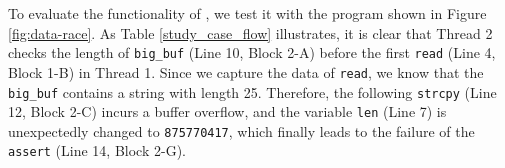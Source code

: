 \begin{table}[]
    \caption{Tailored Control Flow And Data Flow for Figure~\ref{fig:data-race}}
    \label{study_case_flow}
    \centering
\end{table}

To evaluate the functionality of \TheName, we test it with the program shown in
Figure \ref{fig:data-race}. As Table \ref{study_case_flow} illustrates, 
it is clear that Thread 2 checks the length of \texttt{big\_buf} (Line 10, 
Block 2-A) before the first \texttt{read} (Line 4, Block 1-B) in Thread 1. Since 
we capture the data of \texttt{read}, we know that the \texttt{big\_buf} contains 
a string with length 25. Therefore, the following \texttt{strcpy} (Line 12, 
Block 2-C) incurs a buffer overflow, and the variable \texttt{len} (Line 7) 
is unexpectedly changed to \texttt{875770417}, which finally leads to the failure 
of the \texttt{assert} (Line 14, Block 2-G). 

